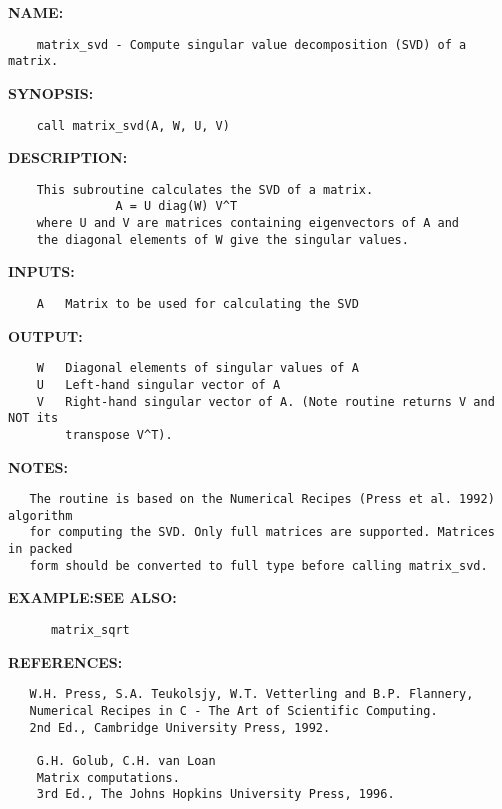\label{ch:robo32}
\label{ch:Matrix_matrix_svd}
\textbf{NAME:}\hspace{0.08in}\begin{Verbatim}
    matrix_svd - Compute singular value decomposition (SVD) of a matrix.
\end{Verbatim}
\textbf{SYNOPSIS:}\hspace{0.08in}\begin{Verbatim}
    call matrix_svd(A, W, U, V)
\end{Verbatim}
\textbf{DESCRIPTION:}\hspace{0.08in}\begin{Verbatim}
    This subroutine calculates the SVD of a matrix.
               A = U diag(W) V^T
    where U and V are matrices containing eigenvectors of A and
    the diagonal elements of W give the singular values.
\end{Verbatim}
\textbf{INPUTS:}\hspace{0.08in}\begin{Verbatim}
    A   Matrix to be used for calculating the SVD
\end{Verbatim}
\textbf{OUTPUT:}\hspace{0.08in}\begin{Verbatim}
    W   Diagonal elements of singular values of A
    U   Left-hand singular vector of A
    V   Right-hand singular vector of A. (Note routine returns V and NOT its 
        transpose V^T).
\end{Verbatim}
\textbf{NOTES:}\hspace{0.08in}\begin{Verbatim}
   The routine is based on the Numerical Recipes (Press et al. 1992) algorithm
   for computing the SVD. Only full matrices are supported. Matrices in packed
   form should be converted to full type before calling matrix_svd.
\end{Verbatim}
\textbf{EXAMPLE:}\hspace{0.08in}\textbf{SEE ALSO:}\hspace{0.08in}\begin{Verbatim}
      matrix_sqrt
\end{Verbatim}
\textbf{REFERENCES:}\hspace{0.08in}\begin{Verbatim}
   W.H. Press, S.A. Teukolsjy, W.T. Vetterling and B.P. Flannery,
   Numerical Recipes in C - The Art of Scientific Computing.
   2nd Ed., Cambridge University Press, 1992.

    G.H. Golub, C.H. van Loan
    Matrix computations. 
    3rd Ed., The Johns Hopkins University Press, 1996.
\end{Verbatim}
